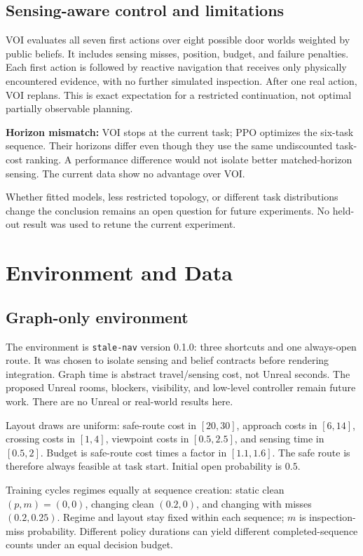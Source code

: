 \documentclass[journal]{IEEEtai}
\begin{document}
\subsection{Sensing-aware control and limitations}
VOI evaluates all seven first actions over eight possible door worlds weighted by public beliefs. It includes sensing misses, position, budget, and failure penalties. Each first action is followed by reactive navigation that receives only physically encountered evidence, with no further simulated inspection. After one real action, VOI replans. This is exact expectation for a restricted continuation, not optimal partially observable planning.

\textbf{Horizon mismatch:} VOI stops at the current task; PPO optimizes the six-task sequence. Their horizons differ even though they use the same undiscounted task-cost ranking. A performance difference would not isolate better matched-horizon sensing. The current data show no advantage over VOI.

Whether fitted models, less restricted topology, or different task distributions change the conclusion remains an open question for future experiments. No held-out result was used to retune the current experiment.

\section{Environment and Data}
\subsection{Graph-only environment}
The environment is \texttt{stale-nav} version 0.1.0: three shortcuts and one always-open route. It was chosen to isolate sensing and belief contracts before rendering integration. Graph time is abstract travel/sensing cost, not Unreal seconds. The proposed Unreal rooms, blockers, visibility, and low-level controller remain future work. There are no Unreal or real-world results here.

Layout draws are uniform: safe-route cost in $[20,30]$, approach costs in $[6,14]$, crossing costs in $[1,4]$, viewpoint costs in $[0.5,2.5]$, and sensing time in $[0.5,2]$. Budget is safe-route cost times a factor in $[1.1,1.6]$. The safe route is therefore always feasible at task start. Initial open probability is $0.5$.

Training cycles regimes equally at sequence creation: static clean $(p,m)=(0,0)$, changing clean $(0.2,0)$, and changing with misses $(0.2,0.25)$. Regime and layout stay fixed within each sequence; $m$ is inspection-miss probability. Different policy durations can yield different completed-sequence counts under an equal decision budget.
\end{document}
